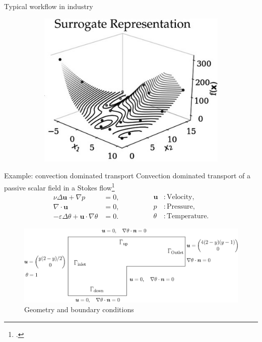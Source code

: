 \documentclass[aspectratio=169]{beamer}
\begin{document}
\begin{frame}{Typical workflow in industry}
\begin{itemize}
\begin{figure}[t]
\begin{subfigure}[t]{0.4\textwidth}
			\includegraphics[width=.8\columnwidth]{surrogate_model.jpg}
		\end{subfigure}
	\end{figure}
	\end{itemize}
\end{frame}

\begin{frame}{Example: convection dominated transport}
	Convection dominated transport of a passive scalar field in a Stokes flow\footcite{volker2017review}
	\begin{equation*}
		\begin{aligned}
			\nu \Delta \bm{u} + \nabla p &=0, \\
			\nabla \cdot \bm{u} &=0, \\
			-\varepsilon \Delta \theta + \bm{u} \cdot \nabla \theta &=0.
		\end{aligned} \qquad \qquad 
	\begin{aligned}
		\bm{u} &: \text{Velocity}, \\
		p &: \text{Pressure}, \\
		\theta &: \text{Temperature}.
	\end{aligned}
	\end{equation*}
	\begin{figure}
		\centering
		\includegraphics[width=.75\textwidth]{channel_convection_T.eps}
		\caption*{Geometry and boundary conditions}
	\end{figure}
\end{frame}
\end{document}
